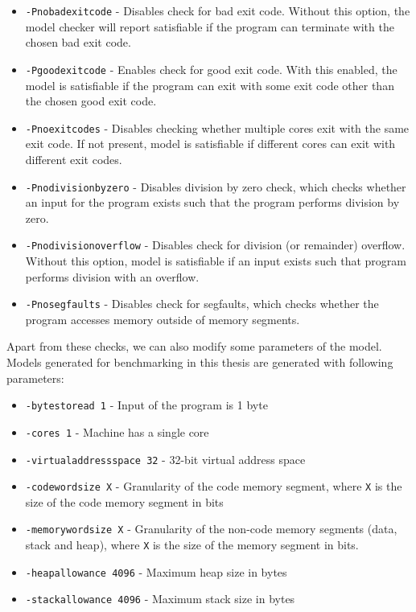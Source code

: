 \documentclass[12pt]{article}
\begin{document}
\begin{itemize}
    \item \texttt{-Pnobadexitcode} - Disables check for bad exit code. Without
        this option, the model checker will report satisfiable if the program
        can terminate with the chosen bad exit code.
    \item \texttt{-Pgoodexitcode} - Enables check for good exit code. With this
        enabled, the model is satisfiable if the program can exit with some 
        exit code other than the chosen good exit code.
    \item \texttt{-Pnoexitcodes} - Disables checking whether multiple cores
        exit with the same exit code. If not present, model is satisfiable if
        different cores can exit with different exit codes.
    \item \texttt{-Pnodivisionbyzero} - Disables division by zero check, which
        checks whether an input for the program exists such that the program
        performs division by zero.
    \item \texttt{-Pnodivisionoverflow} - Disables check for division (or
        remainder) overflow. Without this option, model is satisfiable if an
        input exists such that program performs division with an overflow.
    \item \texttt{-Pnosegfaults} - Disables check for segfaults, which checks
        whether the program accesses memory outside of memory segments.
\end{itemize}

Apart from these checks, we can also modify some parameters of the model.
Models generated for benchmarking in this thesis are generated with following
parameters: 

\begin{itemize}
    \item \texttt{-bytestoread 1} - Input of the program is 1 byte
    \item \texttt{-cores 1} - Machine has a single core
    \item \texttt{-virtualaddressspace 32} - 32-bit virtual address space
    \item \texttt{-codewordsize X} - Granularity of the code memory segment,
        where \texttt{X} is the size of the code memory segment in bits
    \item \texttt{-memorywordsize X} - Granularity of the non-code memory
        segments (data, stack and heap), where \texttt{X} is the size of the
        memory segment in bits.
    \item \texttt{-heapallowance 4096} - Maximum heap size in bytes
    \item \texttt{-stackallowance 4096} - Maximum stack size in bytes
\end{itemize}
\end{document}
